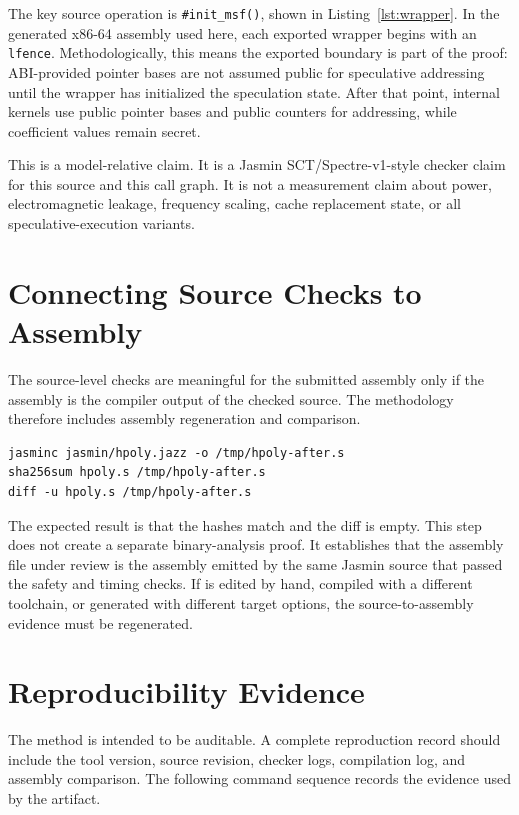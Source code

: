 \documentclass[10pt,twocolumn]{article}
\newcommand{\jasmin}{Jasmin}
\begin{document}
The key source operation is \texttt{\#init\_msf()}, shown in
Listing~\ref{lst:wrapper}.  In the generated x86-64 assembly used here, each
exported wrapper begins with an \texttt{lfence}.  Methodologically, this means
the exported boundary is part of the proof: ABI-provided pointer bases are not
assumed public for speculative addressing until the wrapper has initialized the
speculation state.  After that point, internal kernels use public pointer bases
and public counters for addressing, while coefficient values remain secret.

This is a model-relative claim.  It is a \jasmin{} SCT/Spectre-v1-style checker
claim for this source and this call graph.  It is not a measurement claim about
power, electromagnetic leakage, frequency scaling, cache replacement state, or
all speculative-execution variants.

\section{Connecting Source Checks to Assembly}

The source-level checks are meaningful for the submitted assembly only if the
assembly is the compiler output of the checked source.  The methodology
therefore includes assembly regeneration and comparison.

\begin{lstlisting}[language=Shell,caption={Assembly regeneration and comparison.},label={lst:asmcmd}]
jasminc jasmin/hpoly.jazz -o /tmp/hpoly-after.s
sha256sum hpoly.s /tmp/hpoly-after.s
diff -u hpoly.s /tmp/hpoly-after.s
\end{lstlisting}

The expected result is that the hashes match and the diff is empty.  This step
does not create a separate binary-analysis proof.  It establishes that the
assembly file under review is the assembly emitted by the same \jasmin{} source
that passed the safety and timing checks.  If  is edited by hand,
compiled with a different toolchain, or generated with different target
options, the source-to-assembly evidence must be regenerated.

\section{Reproducibility Evidence}

The method is intended to be auditable.  A complete reproduction record should
include the tool version, source revision, checker logs, compilation log, and
assembly comparison.  The following command sequence records the evidence used
by the artifact.
\end{document}
